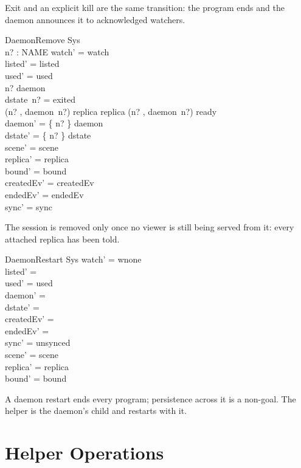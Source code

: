\documentclass[a4paper,10pt,fleqn]{article}
\begin{document}
Exit and an explicit kill are the same transition: the program ends and
the daemon announces it to acknowledged watchers.

\begin{schema}{DaemonRemove}
  \Delta Sys \\
  n? : NAME
\where
  watch' = watch \\
  listed' = listed \\
  used' = used \\
  n? \in \dom daemon \\
  dstate~n? = exited \\
  (n? , daemon~n?) \in \dom replica \implies
    replica (n? , daemon~n?) \neq ready \\
  daemon' = \{ n? \} \ndres daemon \\
  dstate' = \{ n? \} \ndres dstate \\
  scene' = scene \\
  replica' = replica \\
  bound' = bound \\
  createdEv' = createdEv \\
  endedEv' = endedEv \\
  sync' = sync
\end{schema}

The session is removed only once no viewer is still being served from
it: every attached replica has been told.

\begin{schema}{DaemonRestart}
  \Delta Sys
\where
  watch' = wnone \\
  listed' = \emptyset \\
  used' = used \\
  daemon' = \emptyset \\
  dstate' = \emptyset \\
  createdEv' = \emptyset \\
  endedEv' = \emptyset \\
  sync' = unsynced \\
  scene' = scene \\
  replica' = replica \\
  bound' = bound
\end{schema}

A daemon restart ends every program; persistence across it is a
non-goal.  The helper is the daemon's child and restarts with it.

\section{Helper Operations}
\end{document}
